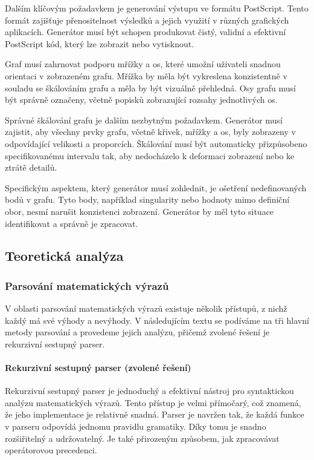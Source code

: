 \documentclass[12pt]{article} %
\begin{document}
Dalším klíčovým požadavkem je generování výstupu ve formátu PostScript. Tento formát zajišťuje přenositelnost výsledků a jejich využití v různých grafických aplikacích. Generátor musí být schopen produkovat čistý, validní a efektivní PostScript kód, který lze zobrazit nebo vytisknout.

Graf musí zahrnovat podporu mřížky a os, které umožní uživateli snadnou orientaci v zobrazeném grafu. Mřížka by měla být vykreslena konzistentně v souladu se škálováním grafu a měla by být vizuálně přehledná. Osy grafu musí být správně označeny, včetně popisků zobrazující rozsahy jednotlivých os.

Správné škálování grafu je dalším nezbytným požadavkem. Generátor musí zajistit, aby všechny prvky grafu, včetně křivek, mřížky a os, byly zobrazeny v odpovídající velikosti a proporcích. Škálování musí být automaticky přizpůsobeno specifikovanému intervalu tak, aby nedocházelo k deformaci zobrazení nebo ke ztrátě detailů.

Specifickým aspektem, který generátor musí zohlednit, je ošetření nedefinovaných bodů v grafu. Tyto body, například singularity nebo hodnoty mimo definiční obor, nesmí narušit konzistenci zobrazení. Generátor by měl tyto situace identifikovat a správně je zpracovat.


\subsection{Teoretická analýza}

\subsubsection{Parsování matematických výrazů}

V oblasti parsování matematických výrazů existuje několik přístupů, z nichž každý má své výhody a nevýhody. V následujícím textu se podíváme na tři hlavní metody parsování a provedeme jejich analýzu, přičemž zvolené řešení je rekurzivní sestupný parser.
\paragraph{Rekurzivní sestupný parser (zvolené řešení)}

Rekurzivní sestupný parser je jednoduchý a efektivní nástroj pro syntaktickou analýzu matematických výrazů. Tento přístup je velmi přímočarý, což znamená, že jeho implementace je relativně snadná. Parser je navržen tak, že každá funkce v parseru odpovídá jednomu pravidlu gramatiky. Díky tomu je snadno rozšiřitelný a udržovatelný. Je také přirozeným způsobem, jak zpracovávat operátorovou precedenci.
\end{document}
